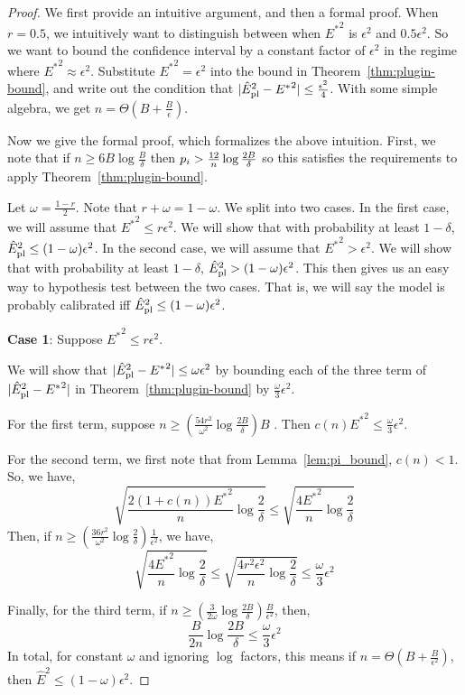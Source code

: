 \begin{proof}
We first provide an intuitive argument, and then a formal proof. When $r = 0.5$, we intuitively want to distinguish between when ${E^*}^2$ is $\epsilon^2$ and $0.5\epsilon^2$. So we want to bound the confidence interval by a constant factor of $\epsilon^2$ in the regime where ${E^*}^2 \approx \epsilon^2$. Substitute ${E^*}^2 = \epsilon^2$ into the bound in Theorem~\ref{thm:plugin-bound}, and write out the condition that $| \hat{E}_{\textup{pl}}^2{} - {E^*}^2 | \leq \frac{\epsilon^2}{4}$. With some simple algebra, we get $n = \Theta(B + \frac{B}{\epsilon})$.

Now we give the formal proof, which formalizes the above intuition. First, we note that if $n \geq 6B \log{\frac{B}{\delta}}$ then $p_i > \frac{12}{n}\log{\frac{2B}{\delta}}{}$ so this satisfies the requirements to apply Theorem~\ref{thm:plugin-bound}.

Let $\omega = \frac{1-r}{2}$. Note that $r + \omega = 1 - \omega$. We split into two cases. In the first case, we will assume that ${E^*}^2 \leq r \epsilon^2$. We will show that with probability at least $1 - \delta$, $\hat{E}_{\textup{pl}}^2{} \leq (1-\omega) \epsilon^2$. In the second case, we will assume that ${E^*}^2 > \epsilon^2$. We will show that with probability at least $1 - \delta$, $\hat{E}_{\textup{pl}}^2{} > (1-\omega) \epsilon^2$. This then gives us an easy way to hypothesis test between the two cases. That is, we will say the model is probably calibrated iff $\hat{E}_{\textup{pl}}^2{} \leq (1-\omega) \epsilon^2$.

\textbf{Case 1}: Suppose  ${E^*}^2 \leq r \epsilon^2$.

We will show that $| \hat{E}_{\textup{pl}}^2{} - {E^*}^2 | \leq \omega \epsilon^2$ by bounding each of the three term of  $| \hat{E}_{\textup{pl}}^2{} - {E^*}^2 |$ in Theorem~\ref{thm:plugin-bound} by $\frac{\omega}{3}\epsilon^2$.

For the first term, suppose $n \geq (\frac{54r^2}{\omega^2}\log{\frac{2B}{\delta}})B$ . Then $c(n) {E^*}^2 \leq \frac{\omega}{3}\epsilon^2$.

For the second term, we first note that from Lemma~\ref{lem:pi_bound}, $c(n) < 1$. So, we have,
\[ \sqrt{\frac{2(1+c(n)){E^*}^2}{n} \log{\frac{2}{\delta}}} \leq \sqrt{\frac{4{E^*}^2}{n} \log{\frac{2}{\delta}}} \]
Then, if $n \geq (\frac{36r^2}{\omega^2} \log{\frac{2}{\delta}})\frac{1}{\epsilon^2}$, we have,
\[ \sqrt{\frac{4{E^*}^2}{n} \log{\frac{2}{\delta}}} \leq \sqrt{\frac{4r^2\epsilon^2}{n} \log{\frac{2}{\delta}}} \leq \frac{\omega}{3}\epsilon^2 \]

Finally, for the third term, if $n \geq (\frac{3}{2\omega} \log{\frac{2B}{\delta}}) \frac{B}{\epsilon^2}$, then,
\[ \frac{B}{2n} \log{\frac{2B}{\delta}} \leq \frac{\omega}{3}\epsilon^2 \]
In total, for constant $\omega$ and ignoring $\log$ factors, this means if $n = \Theta(B + \frac{B}{\epsilon^2})$, then $\hat{E}^2 \leq (1-\omega) \epsilon^2$.


\end{proof}
